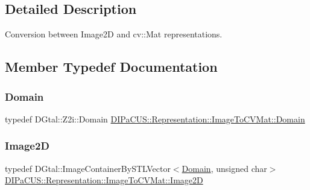 \subsection{Detailed Description}
Conversion between Image2D and cv\+::\+Mat representations. 



\subsection{Member Typedef Documentation}
\mbox{\label{structDIPaCUS_1_1Representation_1_1ImageToCVMat_ab2ddd8fb775a4962089398b3fbbea75c}} 
\subsubsection{\texorpdfstring{Domain}{Domain}}
{\footnotesize\ttfamily typedef D\+Gtal\+::\+Z2i\+::\+Domain \mbox{\hyperlink{structDIPaCUS_1_1Representation_1_1ImageToCVMat_ab2ddd8fb775a4962089398b3fbbea75c}{D\+I\+Pa\+C\+U\+S\+::\+Representation\+::\+Image\+To\+C\+V\+Mat\+::\+Domain}}}

\mbox{\label{structDIPaCUS_1_1Representation_1_1ImageToCVMat_acca980e3cfd7e8980cf058d1e8cfb169}} 
\subsubsection{\texorpdfstring{Image2D}{Image2D}}
{\footnotesize\ttfamily typedef D\+Gtal\+::\+Image\+Container\+By\+S\+T\+L\+Vector$<$\mbox{\hyperlink{structDIPaCUS_1_1Representation_1_1ImageToCVMat_ab2ddd8fb775a4962089398b3fbbea75c}{Domain}}, unsigned char$>$ \mbox{\hyperlink{structDIPaCUS_1_1Representation_1_1ImageToCVMat_acca980e3cfd7e8980cf058d1e8cfb169}{D\+I\+Pa\+C\+U\+S\+::\+Representation\+::\+Image\+To\+C\+V\+Mat\+::\+Image2D}}}

